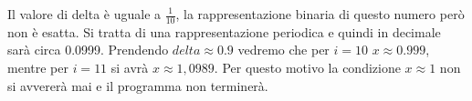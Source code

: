 
Il valore di delta è uguale a \(\frac{1}{10}\), la rappresentazione binaria di questo numero però non è esatta.
Si tratta di una rappresentazione periodica e quindi in decimale sarà circa 0.0999. Prendendo $delta\approx0.9$ vedremo che per $i=10$ $x\approx0.999$, mentre per $i=11$  si avrà $x\approx1,0989$. Per questo motivo la condizione $x\approx1$ non si avvererà mai e il programma non terminerà.